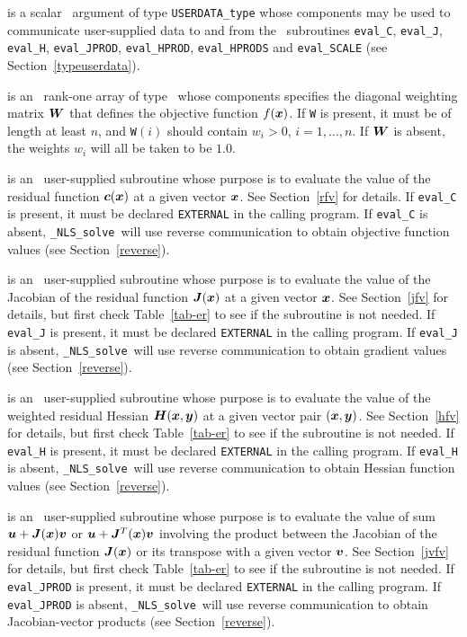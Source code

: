 \documentclass{galahad}
\newcommand{\packagename}{NLS}
\newcommand{\fullpackagename}{\libraryname\_\packagename}
\newcommand{\solver}{{\tt \fullpackagename\_solve}}
\begin{document}
\begin{description}
 is a scalar \intentinout\ argument of type
{\tt USERDATA\_type} whose components may be used
to communicate user-supplied data to and from the \optional\ subroutines
{\tt eval\_C}, {\tt eval\_J}, {\tt eval\_H}, {\tt eval\_JPROD},
{\tt eval\_HPROD}, {\tt eval\_HPRODS} and {\tt eval\_SCALE}
(see Section~\ref{typeuserdata}).

 is an \optional\ rank-one array of type \realdp\
whose components specifies the diagonal weighting matrix ${\bm{W}}$ that
defines the objective function $f({\bm{x}})$. If {\tt W} is present, it
must be of length at least $n$, and {\tt W}$(i)$ should contain $w_i > 0$,
$i = 1, \ldots, n$. If ${\bm{W}}$ is absent, the weights $w_i$ will all be
taken to be $1.0$.

 is an \optional\
user-supplied subroutine whose purpose is to evaluate the value of the
residual function ${\bm{c}}({\bm{x}})$ at a given vector ${\bm{x}}$.
See Section~\ref{rfv} for details.
If {\tt eval\_C} is present,
it must be declared {\tt EXTERNAL} in the calling program.
If {\tt eval\_C} is absent, \solver\ will use reverse communication to
obtain objective function values (see Section~\ref{reverse}).

 is an \optional\
user-supplied subroutine whose purpose is to evaluate the value of the
Jacobian of the residual function ${\bm{J}}({\bm{x}})$ at a given vector ${\bm{x}}$.
See Section~\ref{jfv} for details,
but first check Table~\ref{tab-er} to see if the subroutine is not needed.
If {\tt eval\_J} is present,
it must be declared {\tt EXTERNAL} in the calling program.
If {\tt eval\_J} is absent, \solver\ will use reverse communication to
obtain gradient values (see Section~\ref{reverse}).

\itt{eval\_H} is an \optional\
user-supplied subroutine whose purpose is to evaluate the value of the
weighted residual Hessian ${\bm{H}}({\bm{x}},{\bm{y}})$ at a given vector pair
$({\bm{x}},{\bm{y}})$. See Section~\ref{hfv} for details,
but first check Table~\ref{tab-er} to see if the subroutine is not needed.
If {\tt eval\_H} is present,
it must be declared {\tt EXTERNAL} in the calling program.
If {\tt eval\_H} is absent, \solver\ will use reverse communication to
obtain Hessian function values (see Section~\ref{reverse}).

\itt{eval\_JPROD} is an \optional\
user-supplied subroutine whose purpose is to evaluate the value of sum
${\bm{u}} + {\bm{J}}({\bm{x}}){\bm{v}}$ or ${\bm{u}} + {\bm{J}}^T({\bm{x}}){\bm{v}}$ involving the
product between the Jacobian of the
residual function ${\bm{J}}({\bm{x}})$ or its transpose with a given vector ${\bm{v}}$.
See Section~\ref{jvfv} for details,
but first check Table~\ref{tab-er} to see if the subroutine is not needed.
If {\tt eval\_JPROD} is present,
it must be declared {\tt EXTERNAL} in the calling program.
If {\tt eval\_JPROD} is absent, \solver\ will use reverse communication to
obtain Jacobian-vector products (see Section~\ref{reverse}).


\end{description}
\end{document}
